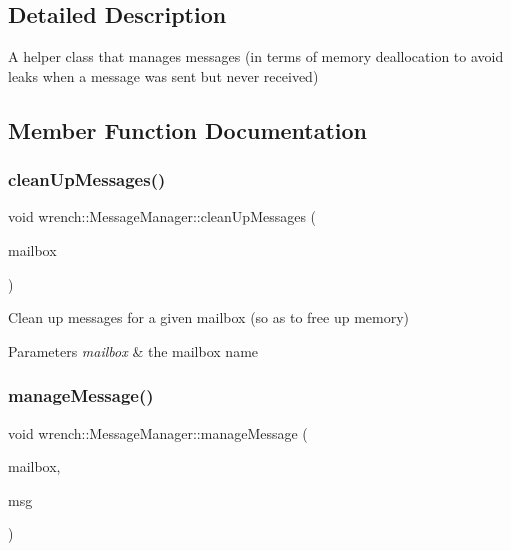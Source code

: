 \subsection{Detailed Description}
A helper class that manages messages (in terms of memory deallocation to avoid leaks when a message was sent but never received) 

\subsection{Member Function Documentation}
\mbox{\label{classwrench_1_1_message_manager_a24d0ac978cf92cb70f98b308bd300487}} 
\subsubsection{\texorpdfstring{clean\+Up\+Messages()}{cleanUpMessages()}}
{\footnotesize\ttfamily void wrench\+::\+Message\+Manager\+::clean\+Up\+Messages (\begin{DoxyParamCaption}\item[{std\+::string}]{mailbox }\end{DoxyParamCaption})\hspace{0.3cm}{\ttfamily [static]}}



Clean up messages for a given mailbox (so as to free up memory) 


\begin{DoxyParams}{Parameters}
{\em mailbox} & the mailbox name \\
\hline
\end{DoxyParams}
\mbox{\label{classwrench_1_1_message_manager_aac4ff7331cc629bae0f74837d650d083}} 
\subsubsection{\texorpdfstring{manage\+Message()}{manageMessage()}}
{\footnotesize\ttfamily void wrench\+::\+Message\+Manager\+::manage\+Message (\begin{DoxyParamCaption}\item[{std\+::string}]{mailbox,  }\item[{\hyperlink{classwrench_1_1_simulation_message}{Simulation\+Message} $\ast$}]{msg }\end{DoxyParamCaption})\hspace{0.3cm}{\ttfamily [static]}}



